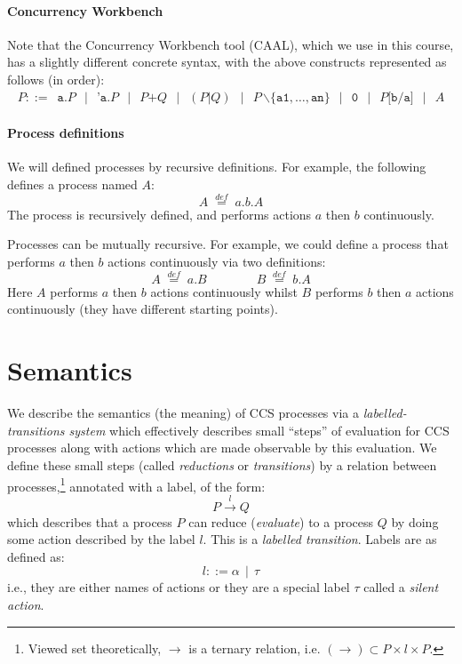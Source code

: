 \documentclass{article}
\theoremstyle{definition}
\begin{document}
\paragraph{Concurrency Workbench}
Note that the Concurrency Workbench tool (CAAL), which we use
in this course, has a slightly different
concrete syntax, with the above constructs represented as follows (in order):
%
\begin{align*}
P ::= \;\ \texttt{a} . P \;\,\mid\;\, \texttt{'a} .P \;\,\mid\;\, P \texttt{+} Q \;\,\mid\;\, (P \texttt{|} Q)
\;\,\mid\;\, P \, \texttt{$\backslash\{$}\texttt{a1}, \ldots, \texttt{an}\texttt{$\}$}
\;\,\mid\;\, \texttt{0} \;\,\mid\;\, P\texttt{[b/a]} \;\,\mid\;\, A
\end{align*}

\paragraph{Process definitions}

We will defined processes by recursive definitions. For example, the
following defines a process named $A$:
%
\begin{equation*}
A \; {\mathrel{\mathop{=}\limits^{{def}}}} \; a.b.A
\end{equation*}
%
The process is recursively defined, and performs actions $a$ then $b$
continuously.

Processes can be mutually recursive. For example, we could
define a process that performs $a$ then $b$ actions
continuously via two definitions:
%
\begin{equation*}
  A \; {\mathrel{\mathop{=}\limits^{{def}}}} \; a.B
  \qquad\qquad
  B \; {\mathrel{\mathop{=}\limits^{{def}}}} \; b.A
\end{equation*}
%
Here $A$ performs $a$ then $b$ actions
continuously whilst $B$ performs $b$ then $a$ actions
continuously (they have different starting points).

\vspace{-1em}
\section{Semantics}

We describe the semantics (the meaning) of CCS processes via a
\emph{labelled-transitions system} which effectively describes small
``steps'' of evaluation for CCS processes along with actions which are
made observable by this evaluation.  We define these small steps
(called \emph{reductions} or \emph{transitions})
by a relation between processes,\footnote{Viewed set theoretically,
  $\rightarrow$ is a ternary relation, i.e.
  $(\rightarrow) \subset P \times l \times P$.}  annotated with a
label, of the form:
%
\begin{equation*}
P \xrightarrow{l} Q
\end{equation*}
%
which describes that a process $P$ can reduce (\emph{evaluate}) to a
process $Q$ by doing some action described by the label $l$.
This is a \emph{labelled transition}.
Labels are as defined as:
$$l ::= \alpha \,\mid\, \tau$$
i.e., they are
either names of actions or they are a special label $\tau$ called a
\emph{silent action}.
\end{document}
